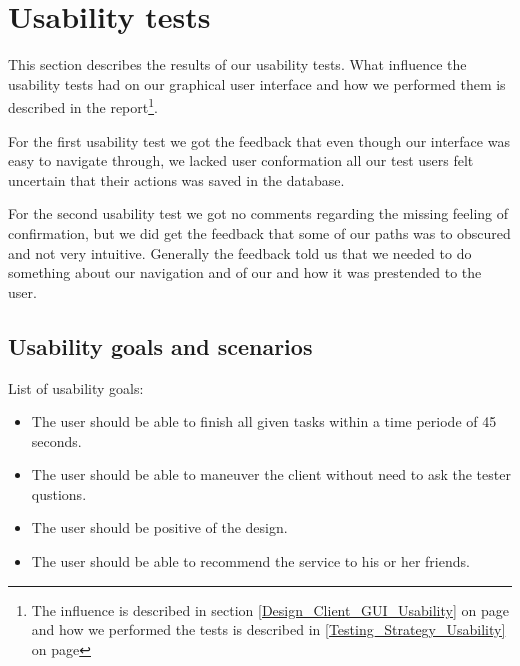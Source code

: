 \section{Usability tests}
\label{Appendix_Test_Usability}
This section describes the results of our usability tests. What influence the usability tests had on our graphical user interface and how we performed them is described in the report\footnote{The influence is described in section \ref {Design_Client_GUI_Usability} on page \pageref{Design_Client_GUI_Usability} and how we performed the tests is described in \ref{Testing_Strategy_Usability} on page \pageref{Testing_Strategy_Usability}}.

For the first usability test we got the feedback that even though our interface was easy to navigate through, we lacked user conformation all our test users felt uncertain that their actions was saved in the database.

For the second usability test we got no comments regarding the missing feeling of confirmation, but we did get the feedback that some of our paths was to obscured and not very intuitive. Generally the feedback told us that we needed to do something about our navigation and of our and how it was prestended to the user.


\subsection{Usability goals and scenarios}
\label{Appendix_Test_Usability_GoalsandScenario}
List of usability goals:
\begin{itemize}\addtolength{\itemsep}{-5pt}
\item The user should be able to finish all given tasks within a time periode of 45 seconds.
\item The user should be able to maneuver the client without need to ask the tester qustions.
\item The user should be positive of the design.
\item The user should be able to recommend the service to his or her friends.
\end {itemize}

